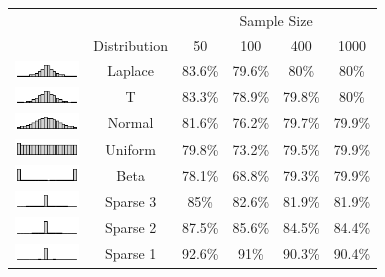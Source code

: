 
\begin{tabular}[t]{>{}cccccc}
\toprule
\multicolumn{2}{c}{  } & \multicolumn{4}{c}{Sample Size} \\
\cmidrule(l{3pt}r{3pt}){3-6}
  & Distribution & 50 & 100 & 400 & 1000\\
\midrule
\includegraphics[width=0.67in, height=0.17in]{distribution_table_a.pdf} & Laplace & 83.6\% & 79.6\% & 80\% & 80\%\\
\includegraphics[width=0.67in, height=0.17in]{distribution_table_b.pdf} & T & 83.3\% & 78.9\% & 79.8\% & 80\%\\
\includegraphics[width=0.67in, height=0.17in]{distribution_table_c.pdf} & Normal & 81.6\% & 76.2\% & 79.7\% & 79.9\%\\
\includegraphics[width=0.67in, height=0.17in]{distribution_table_d.pdf} & Uniform & 79.8\% & 73.2\% & 79.5\% & 79.9\%\\
\includegraphics[width=0.67in, height=0.17in]{distribution_table_e.pdf} & Beta & 78.1\% & 68.8\% & 79.3\% & 79.9\%\\
\includegraphics[width=0.67in, height=0.17in]{distribution_table_f.pdf} & Sparse 3 & 85\% & 82.6\% & 81.9\% & 81.9\%\\
\includegraphics[width=0.67in, height=0.17in]{distribution_table_g.pdf} & Sparse 2 & 87.5\% & 85.6\% & 84.5\% & 84.4\%\\
\includegraphics[width=0.67in, height=0.17in]{distribution_table_h.pdf} & Sparse 1 & 92.6\% & 91\% & 90.3\% & 90.4\%\\
\bottomrule
\end{tabular}
